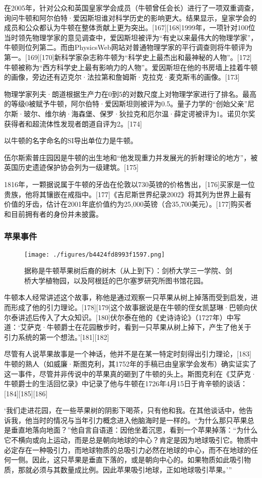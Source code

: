 在2005年，针对公众和英国皇家学会成员（牛顿曾任会长）进行了一项双重调查，询问牛顿和阿尔伯特·爱因斯坦谁对科学历史的影响更大。结果显示，皇家学会的成员和公众都认为牛顿在整体贡献上更为突出。[167][168]1999年，一项针对100位当时领先物理学家的意见调查中，爱因斯坦被评为“有史以来最伟大的物理学家”，牛顿则位列第二。而由PhysicsWeb网站对普通物理学家的平行调查则将牛顿评为第一。[169][170]新科学家杂志称牛顿为“科学史上最杰出和最神秘的人物”。[172]牛顿被称为“西方科学史上最有影响力的人物”。爱因斯坦在他的书房墙上挂着牛顿的画像，旁边还有迈克尔·法拉第和詹姆斯·克拉克·麦克斯韦的画像。[173]

物理学家列夫·朗道根据生产力在0到5的对数尺度上对物理学家进行了排名。最高的等级0被赋予牛顿，阿尔伯特·爱因斯坦则被评为0.5。量子力学的“创始父亲”尼尔斯·玻尔、维尔纳·海森堡、保罗·狄拉克和厄尔温·薛定谔被评为1。诺贝尔奖获得者和超流体性发现者朗道自评为2。[174]

以牛顿的名字命名的SI导出单位力是牛顿。

伍尔斯索普庄园因是牛顿的出生地和“他发现重力并发展光的折射理论的地方”，被英国历史遗迹保护协会列为一级建筑。[175]

1816年，一颗据说属于牛顿的牙齿在伦敦以730英镑的价格售出，[176]买家是一位贵族，他将其镶嵌在戒指中。[177]《吉尼斯世界纪录2002》将其列为世界上最有价值的牙齿，估计在2001年底价值约为25,000英镑（合35,700美元）。[177]购买者和目前拥有者的身份并未披露。
\subsubsection{苹果事件}
\begin{figure}[ht]
\centering
\texttt{[image: ./figures/b4424fd8993f1597.png]}
\caption{据称是牛顿苹果树后裔的树木（从上到下）：剑桥大学三一学院、剑桥大学植物园，以及阿根廷的巴尔塞罗研究所图书馆花园。} \label{fig_Newton_13}
\end{figure}
牛顿本人经常讲述这个故事，称他是通过观察一只苹果从树上掉落而受到启发，进而形成了他的引力理论。[178][179]这个故事据说是在牛顿的侄女凯瑟琳·巴顿向伏尔泰讲述后传入了大众知识。[180]伏尔泰在他的《史诗诗论》（1727年）中写道：‘艾萨克·牛顿爵士在花园散步时，看到一只苹果从树上掉下，产生了他关于引力系统的第一个想法。’[181][182]

尽管有人说苹果故事是一个神话，他并不是在某一特定时刻得出引力理论，[183] 牛顿的熟人（如威廉·斯图克利，其1752年的手稿已由皇家学会发布）确实证实了这一事件，尽管并非传说中的苹果真的砸到了牛顿的头上。斯图克利在《艾萨克·牛顿爵士的生活回忆录》中记录了他与牛顿在1726年4月15日于肯辛顿的谈话：[184][185][186]

‘我们走进花园，在一些苹果树的阴影下喝茶，只有他和我。在其他谈话中，他告诉我，他当时的情况与当年引力概念进入他脑海时是一样的。“为什么那只苹果总是垂直地落向地面？”他自言自语道：因他坐着沉思，看到一个苹果掉落：“为什么它不横向或向上运动，而是总是朝向地球的中心？肯定是因为地球吸引它。物质中必定存在一种吸引力，而地球物质的总吸引力必然在地球的中心，而不在地球的任何一侧。因此，这只苹果是垂直下落的，或是朝向中心的。如果物质如此吸引物质，那就必须与其数量成比例。因此苹果吸引地球，正如地球吸引苹果。’”

